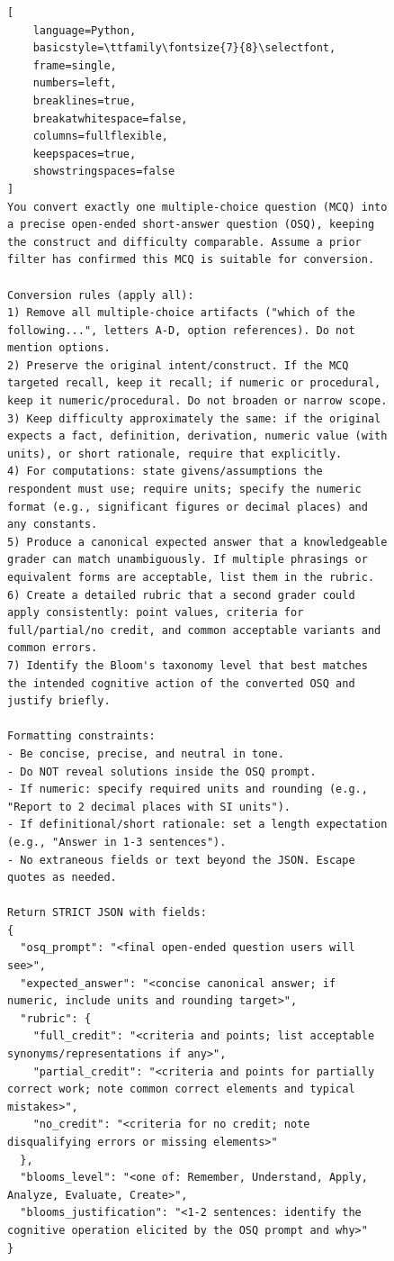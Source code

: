 \begin{figure}[htbp]
\centering
\begin{scriptsize}
\begin{lstlisting}[
    language=Python,
    basicstyle=\ttfamily\fontsize{7}{8}\selectfont,
    frame=single,
    numbers=left,
    breaklines=true,
    breakatwhitespace=false,
    columns=fullflexible,
    keepspaces=true,
    showstringspaces=false
]
You convert exactly one multiple-choice question (MCQ) into a precise open-ended short-answer question (OSQ), keeping the construct and difficulty comparable. Assume a prior filter has confirmed this MCQ is suitable for conversion.

Conversion rules (apply all):
1) Remove all multiple-choice artifacts ("which of the following...", letters A-D, option references). Do not mention options.
2) Preserve the original intent/construct. If the MCQ targeted recall, keep it recall; if numeric or procedural, keep it numeric/procedural. Do not broaden or narrow scope.
3) Keep difficulty approximately the same: if the original expects a fact, definition, derivation, numeric value (with units), or short rationale, require that explicitly.
4) For computations: state givens/assumptions the respondent must use; require units; specify the numeric format (e.g., significant figures or decimal places) and any constants.
5) Produce a canonical expected answer that a knowledgeable grader can match unambiguously. If multiple phrasings or equivalent forms are acceptable, list them in the rubric.
6) Create a detailed rubric that a second grader could apply consistently: point values, criteria for full/partial/no credit, and common acceptable variants and common errors.
7) Identify the Bloom's taxonomy level that best matches the intended cognitive action of the converted OSQ and justify briefly.

Formatting constraints:
- Be concise, precise, and neutral in tone.
- Do NOT reveal solutions inside the OSQ prompt.
- If numeric: specify required units and rounding (e.g., "Report to 2 decimal places with SI units").
- If definitional/short rationale: set a length expectation (e.g., "Answer in 1-3 sentences").
- No extraneous fields or text beyond the JSON. Escape quotes as needed.

Return STRICT JSON with fields:
{
  "osq_prompt": "<final open-ended question users will see>",
  "expected_answer": "<concise canonical answer; if numeric, include units and rounding target>",
  "rubric": {
    "full_credit": "<criteria and points; list acceptable synonyms/representations if any>",
    "partial_credit": "<criteria and points for partially correct work; note common correct elements and typical mistakes>",
    "no_credit": "<criteria for no credit; note disqualifying errors or missing elements>"
  },
  "blooms_level": "<one of: Remember, Understand, Apply, Analyze, Evaluate, Create>",
  "blooms_justification": "<1-2 sentences: identify the cognitive operation elicited by the OSQ prompt and why>"
}


\end{lstlisting}
\end{scriptsize}
\end{figure}
